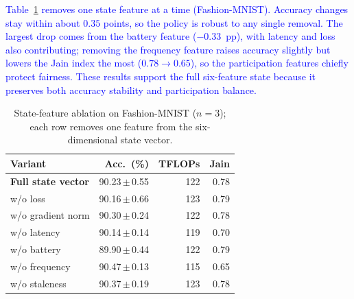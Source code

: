 \documentclass[journal]{IEEEtran}
\newcommand{\revision}[1]{\textcolor{blue}{#1}}
\begin{document}
\revision{Table~\ref{tab:ablation} removes one state feature at a time (Fashion-MNIST). Accuracy changes stay within about $0.35$ points, so the policy is robust to any single removal. The largest drop comes from the battery feature ($-0.33$~pp), with latency and loss also contributing; removing the frequency feature raises accuracy slightly but lowers the Jain index the most ($0.78\!\to\!0.65$), so the participation features chiefly protect fairness. These results support the full six-feature state because it preserves both accuracy stability and participation balance.}

\begin{table}[H]
\centering
\color{blue}
\caption{State-feature ablation on Fashion-MNIST ($n=3$); each row removes one feature from the six-dimensional state vector.}
\label{tab:ablation}
\scriptsize
\setlength{\tabcolsep}{3.4pt}
\renewcommand{\arraystretch}{0.92}
\begin{tabular*}{\columnwidth}{@{\extracolsep{\fill}}lrrr@{}}
\toprule
Variant & Acc.\ (\%) & TFLOPs & Jain \\
\midrule
\textbf{Full state vector} & 90.23\,$\pm$\,0.55 & 122 & 0.78 \\
w/o loss & 90.16\,$\pm$\,0.66 & 123 & 0.79 \\
w/o gradient norm & 90.30\,$\pm$\,0.24 & 122 & 0.78 \\
w/o latency & 90.14\,$\pm$\,0.14 & 119 & 0.70 \\
w/o battery & 89.90\,$\pm$\,0.44 & 122 & 0.79 \\
w/o frequency & 90.47\,$\pm$\,0.13 & 115 & 0.65 \\
w/o staleness & 90.37\,$\pm$\,0.19 & 123 & 0.78 \\
\bottomrule
\end{tabular*}
\vspace{0mm}
\end{table}


\FloatBarrier
\end{document}
